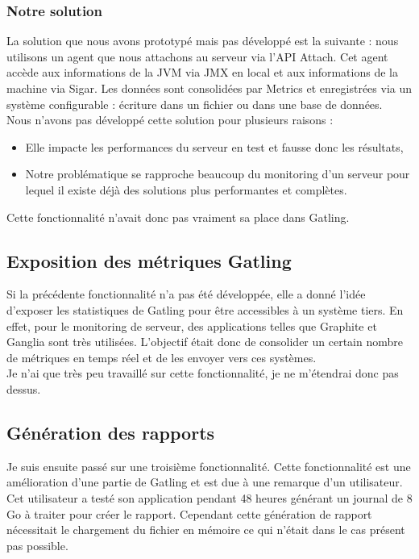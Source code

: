 \subsubsection{Notre solution}

La solution que nous avons prototypé mais pas développé est la suivante : nous utilisons un agent que nous attachons au serveur via l'API Attach. Cet agent accède aux informations de la JVM via JMX en local et aux informations de la machine via Sigar. Les données sont consolidées par Metrics et enregistrées via un système configurable : écriture dans un fichier ou dans une base de données.\\

Nous n'avons pas développé cette solution pour plusieurs raisons :
\begin{itemize}
 \item Elle impacte les performances du serveur en test et fausse donc les résultats,
 \item Notre problématique se rapproche beaucoup du monitoring d'un serveur pour lequel il existe déjà des solutions plus performantes et complètes.\\
\end{itemize}

Cette fonctionnalité n'avait donc pas vraiment sa place dans Gatling.

\subsection{Exposition des métriques Gatling}

Si la précédente fonctionnalité n'a pas été développée, elle a donné l'idée d'exposer les statistiques de Gatling pour être accessibles à un système tiers. En effet, pour le monitoring de serveur, des applications telles que Graphite et Ganglia sont très utilisées. L'objectif était donc de consolider un certain nombre de métriques en temps réel et de les envoyer vers ces systèmes.\\

Je n'ai que très peu travaillé sur cette fonctionnalité, je ne m'étendrai donc pas dessus.

\subsection{Génération des rapports}

Je suis ensuite passé sur une troisième fonctionnalité. Cette fonctionnalité est une amélioration d'une partie de Gatling et est due à une remarque d'un utilisateur. Cet utilisateur a testé son application pendant 48 heures générant un journal de 8 Go à traiter pour créer le rapport. Cependant cette génération de rapport nécessitait le chargement du fichier en mémoire ce qui n'était dans le cas présent pas possible.\\

